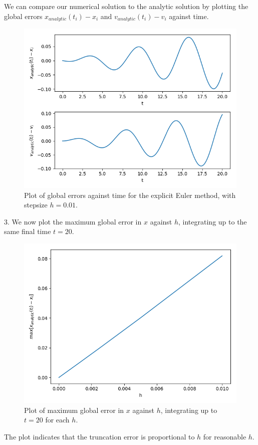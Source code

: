 \documentclass[11pt]{article}
\begin{document}
We can compare our numerical solution to the analytic solution by plotting the global errors $x_{analytic}(t_i) - x_i$ and $v_{analytic}(t_i) - v_i$ against time.
\begin{figure}[htp]
\centering
\includegraphics[scale=0.70]{x_err_and_v_err_plot_1_0_0.01_20.png}
\caption{Plot of global errors against time for the explicit Euler method, with stepsize $h=0.01$.}
\label{expliciterror}
\end{figure}
\newpage

3. We now plot the maximum global error in $x$ against $h$, integrating up to the same final time $t = 20$.
\begin{figure}[htp]
\centering
\includegraphics[scale=0.70]{err_behavior_0.01_4_20.png}
\caption{Plot of maximum global error in $x$ against $h$, integrating up to $t=20$ for each $h$.}
\label{expliciterrbehavior}
\end{figure}

The plot indicates that the truncation error is proportional to $h$ for reasonable $h$.
\end{document}
